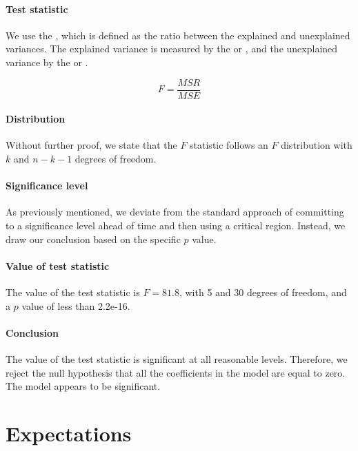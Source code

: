 \paragraph{Test statistic} We use the , which is defined as the ratio between the explained  and unexplained variances. The explained variance is measured by the  or , and the unexplained variance by the  or .

\begin{equation}
  F = \frac{MSR}{MSE}
\end{equation}

\paragraph{Distribution} Without further proof, we state that the $F$ statistic follows an $F$ distribution with $k$ and $n-k-1$ degrees of freedom.

\paragraph{Significance level} As previously mentioned, we deviate from the standard approach of committing to a significance level ahead of time and then using a critical region. Instead, we draw our conclusion based on the specific $p$ value.

\paragraph{Value of test statistic} The value of the test statistic is $F = 81.8$, with 5 and 30 degrees of freedom, and a $p$ value of less than 2.2e-16.

\paragraph{Conclusion} The value of the test statistic is significant at all reasonable levels. Therefore, we reject the null hypothesis that all the coefficients in the model are equal to zero. The model appears to be significant.



\section{Expectations}
\label{sec:expectations}

